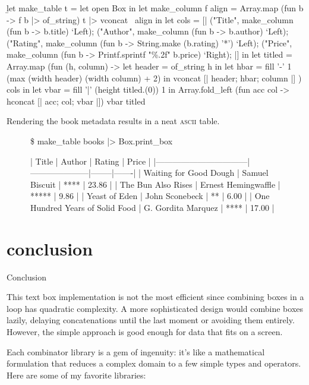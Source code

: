\documentclass{article}
\begin{document}
\begin{code}
\b{let} make_table t =\label{ref-make-table}
    let open Box in
    let make_column f align =
        Array.map (fun b -> f b |> of_string) t |> vconcat ~align in
    let cols = [|
        ("Title",  make_column (fun b -> b.title) `Left);
        ("Author", make_column (fun b -> b.author) `Left);
        ("Rating", make_column (fun b -> String.make (b.rating) '*') `Left);
        ("Price",  make_column (fun b -> Printf.sprintf "\%.2f" b.price) `Right);
    |] in
    let titled = Array.map (fun (h, column) ->
        let header = of_string h in
        let hbar = fill '-' 1 (max (width header) (width column) + 2)
        in vconcat [| header; hbar; column |]
    ) cols in
    let vbar = fill '|' (height titled.(0)) 1 in
    Array.fold_left (fun acc col -> hconcat [| acc; col; vbar |]) vbar titled
\end{code}

Rendering the book metadata results in a neat \textsc{ascii} table.

\begin{figure}
\begin{code}[text]
\$ make_table books |> Box.print_box

|              Title              |       Author        | Rating | Price |
|---------------------------------|---------------------|--------|-------|
| Waiting for Good Dough          | Samuel Biscuit      | ****   | 23.86 |
| The Bun Also Rises              | Ernest Hemingwaffle | *****  |  9.86 |
| Yeast of Eden                   | John Sconebeck      | **     |  6.00 |
| One Hundred Years of Solid Food | G. Gordita Marquez  | ****   | 17.00 |
\end{code}
\end{figure}

\section{conclusion}{Conclusion}

This text box implementation is not the most efficient since combining boxes in a loop has quadratic complexity.
A more sophisticated design would combine boxes lazily, delaying concatenations until the last moment or avoiding them entirely.
However, the simple approach is good enough for data that fits on a screen.

Each combinator library is a gem of ingenuity:
it's like a mathematical formulation that reduces a complex domain to a few simple types and operators.
Here are some of my favorite libraries:
\end{document}
